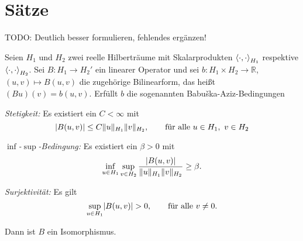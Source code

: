 
\section{Sätze} %
\label{sec:saetze}

TODO: Deutlich besser formulieren, fehlendes ergänzen!

\begin{Satz}
    \label{satz:babuska-aziz}
    Seien $H_{1}$ und $H_{2}$ zwei reelle Hilberträume mit Skalarprodukten $\left\langle\cdot,\cdot\right\rangle_{H_{1}}$ respektive $\left\langle\cdot,\cdot\right\rangle_{H_{2}}$.
    Sei $B \colon H_{1} \to H_{2}'$ ein linearer Operator und
    sei $b \colon H_{1} \times H_{2} \to \mathbb{R}$, $(u, v) \mapsto B(u, v)$ die zugehörige Bilinearform, das heißt $(Bu)(v) = b(u, v)$.
    Erfüllt $b$ die sogenannten Babu{\v{s}}ka-Aziz-Bedingungen
    \begin{thmenumerate}
        \item \emph{Stetigkeit:} Es existiert ein $C < \infty$ mit
        \begin{equation}
            \lvert B(u, v)\rvert \leq C \lVert u\rVert_{H_{1}} \lVert v\rVert_{H_{2}}, \qquad \text{für alle}~u \in H_{1},~v \in H_{2}
        \end{equation}
        \item \emph{$\inf$-$\sup$-Bedingung:} Es existiert ein $\beta > 0$ mit
        \begin{equation}
            \inf_{u \in H_{1}} \sup_{v \in H_{2}} \frac{\lvert B(u, v)\rvert}{\lVert u\rVert_{H_{1}} \lVert v\rVert_{H_{2}}} \geq \beta.
        \end{equation}
        \item \emph{Surjektivität:} Es gilt
        \begin{equation}
            \sup_{u \in H_{1}} \lvert B(u, v)\rvert > 0, \qquad \text{für alle}~v \neq 0.
        \end{equation}
    \end{thmenumerate}
    Dann ist $B$ ein Isomorphismus.
\end{Satz}

